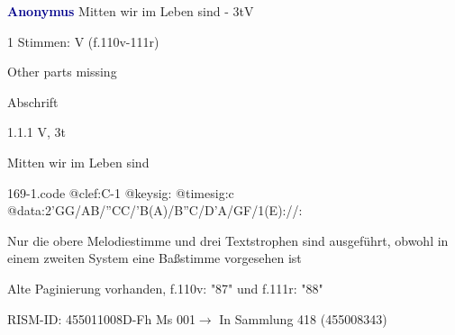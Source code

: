 \documentclass[twocolumn]{book}
\begin{document}
\par \vspace{7pt} \textcolor{darkblue}{\textbf{Anonymus  }}\hfillplus{\textbf{[169]}}\newline Mitten wir im Leben sind - 3t\newline V
\par \begin{itshape}\end{itshape} 
\par \textcolor{darkblue}{}  1 Stimmen: V  (f.110v-111r)\newline \begin{small} Other parts missing\end{small} \newline Abschrift
\par 1.1.1  V, 3t\newline \begin{footnotesize} Mitten wir im Leben sind \end{footnotesize}  
\begin{filecontents*}{169-1.code}
@clef:C-1
@keysig:
@timesig:c
@data:2'GG/AB/''CC/'B(A)/B''C/D'A/GF/1(E)://:
\end{filecontents*}
\newline
%
\par Nur die obere Melodiestimme und drei Textstrophen sind ausgeführt, obwohl in einem zweiten System eine Baßstimme vorgesehen ist
\par Alte Paginierung vorhanden, f.110v: "87" und f.111r: "88"
\par RISM-ID: 455011008\newline D-Fh  Ms 001\newline $\rightarrow$ In Sammlung 418 (455008343)
      
\end{document}
